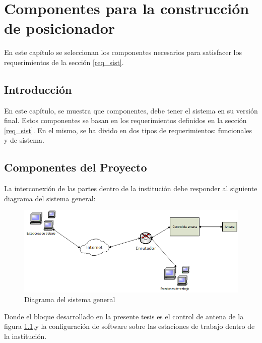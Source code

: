 \renewcommand{\chaptername}{Componentes para la construcción de posicionador}
\chapter{Componentes para la construcción de posicionador} 
\begin{center}
\begin{tcolorbox}[colback=gray!5!white, %
colframe=gray!75!black,
title= \center{\Large{resumen}} ]
En este capítulo se seleccionan los componentes necesarios para satisfacer los requerimientos de la sección \ref{req_sist}.   
\end{tcolorbox}
\end{center}    
\section{Introducción}

En este capítulo, se muestra que componentes, debe tener el sistema en su versión final. Estos componentes se basan en los requerimientos definidos en la sección \ref{req_sist}. En el mismo, se ha divido en dos tipos de requerimientos: funcionales y de sistema. 

\section{Componentes del Proyecto}

La interconexión de las partes dentro de la institución debe responder al siguiente diagrama del sistema general: 
\begin{figure}[ht]	
	\centering
	\includegraphics[scale=0.8]{parte_1/cap2/ssgen}
	\caption{Diagrama del sistema general}
	\label{fig:fig_ssgen}
\end{figure}


Donde el bloque desarrollado en la presente tesis es el control de antena de la figura \ref{fig:fig_ssgen},y la configuración de software sobre las estaciones de trabajo dentro de la institución. 

